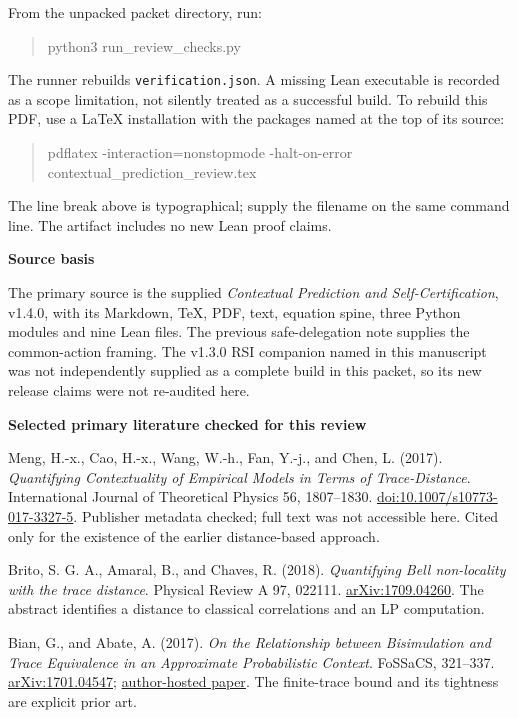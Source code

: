 \documentclass[11pt,letterpaper]{article}
\newcommand{\sub}[1]{{\bfseries\color{ink}#1}\par}
\newcommand{\code}[1]{\texttt{\small #1}}
\begin{document}
From the unpacked packet directory, run:
\begin{quote}\ttfamily\small
python3 run\_review\_checks.py
\end{quote}
The runner rebuilds \code{verification.json}. A missing Lean executable is recorded as a scope limitation, not silently treated as a successful build. To rebuild this PDF, use a LaTeX installation with the packages named at the top of its source:
\begin{quote}\ttfamily\small
pdflatex -interaction=nonstopmode -halt-on-error\\
\hspace*{1em}contextual\_prediction\_review.tex
\end{quote}
The line break above is typographical; supply the filename on the same command line. The artifact includes no new Lean proof claims.

\sub{Source basis}
The primary source is the supplied \textit{Contextual Prediction and Self-Certification}, v1.4.0, with its Markdown, TeX, PDF, text, equation spine, three Python modules and nine Lean files. The previous safe-delegation note supplies the common-action framing. The v1.3.0 RSI companion named in this manuscript was not independently supplied as a complete build in this packet, so its new release claims were not re-audited here.

\sub{Selected primary literature checked for this review}
\begin{enumerate}[label={[\arabic*]}]
\item Meng, H.-x., Cao, H.-x., Wang, W.-h., Fan, Y.-j., and Chen, L. (2017). \textit{Quantifying Contextuality of Empirical Models in Terms of Trace-Distance}. International Journal of Theoretical Physics 56, 1807--1830. \href{https://doi.org/10.1007/s10773-017-3327-5}{doi:10.1007/s10773-017-3327-5}. Publisher metadata checked; full text was not accessible here. Cited only for the existence of the earlier distance-based approach.
\item Brito, S. G. A., Amaral, B., and Chaves, R. (2018). \textit{Quantifying Bell non-locality with the trace distance}. Physical Review A 97, 022111. \href{https://arxiv.org/abs/1709.04260}{arXiv:1709.04260}. The abstract identifies a distance to classical correlations and an LP computation.
\item Bian, G., and Abate, A. (2017). \textit{On the Relationship between Bisimulation and Trace Equivalence in an Approximate Probabilistic Context}. FoSSaCS, 321--337. \href{https://arxiv.org/abs/1701.04547}{arXiv:1701.04547}; \href{https://www.cs.ox.ac.uk/people/alessandro.abate/publications/bcBA17.pdf}{author-hosted paper}. The finite-trace bound and its tightness are explicit prior art.
\end{enumerate}
\end{document}
